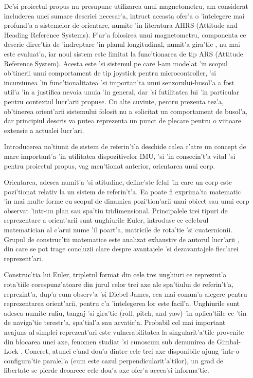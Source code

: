 \documentclass[12pt,a4paper,twoside]{report}
\begin{document}
De'si proiectul propus nu presupune utilizarea unui magnetometru, am considerat includerea unei sumare descriei necesar'a, intruc\ia t aceasta ofer'a o 'intelegere mai profund'a a sistemelor de orientare, numite 'in literatura AHRS (Attitude and Heading Reference Systems). F'ar'a folosirea unui magnetometru, componenta ce descrie direc'tia de 'indreptare 'in planul longitudinal, numit'a gira'tie \cite{article2},  nu mai este evaluat'a, iar noul sistem este limitat la func'tionarea de tip ARS (Attitude Reference System). Acesta este 'si sistemul pe care l-am modelat 'in scopul ob'tinerii unui comportament de tip joystick pentru microcontroller, 'si incursiunea 'in func'tionalitatea 'si importan'ta unui senzorului-busol'a a fost util'a 'in a justifica nevoia unuia 'in general, dar 'si futilitatea lui 'in particular pentru contextul lucr'arii propuse. Cu alte cuvinte, pentru prezenta tez'a, ob'tinerea orient'arii sistemului folosit nu a solicitat un comportament de busol'a, dar principiul descris va putea reprezenta un punct de plecare pentru o viitoare extensie a actualei lucr'ari.

\vspace{5px}

Introducerea no'tiunii de sistem de referin't'a deschide calea c'atre un concept de mare important'a 'in utilitatea dispozitivelor IMU, 'si 'in consecin't'a vital 'si pentru proiectul propus, vag men'tionat anterior, orientarea unui corp.

\vspace{5px}

Orientarea, adesea numit'a 'si atitudine, define'ste felul 'in care un corp este pozi'tionat relativ la un sistem de referin't'a. Ea poate fi exprima'ta matematic 'in mai multe forme cu scopul de dinamica pozi'tion'arii unui obiect sau unui corp observat 'intr-un plan sau spa'tiu tridimensional. Principalele trei tipuri de reprezentare a orient'arii sunt unghiurile Euler, introduse ce celebrul matematician al c'arui nume 'il poart'a, matricile de rota'tie 'si cuaternionii. Grupul de construc'tii matematice este analizat exhaustiv de autorul lucr'arii \cite{article3}, din care se pot trage concluzii clare despre avantajele 'si dezavantajele fiec'arei reprezent'ari.

\vspace{5px}

Construc'tia lui Euler, tripletul format din cele trei unghiuri ce reprezint'a rota'tiile corespunz'atoare din jurul celor trei axe ale spa'tiului de referin't'a, reprezint'a, dup'a cum observ'a 'si Diebel James, cea mai comun'a alegere pentru reprezentarea orient'arii, pentru c'a 'intelegerea lor este facil'a. Unghiurile sunt adesea numite ruliu, tangaj 'si gira'tie (roll, pitch, and yaw) 'in aplica'tiile ce 'tin de naviga'tie terestr'a, spa'tial'a sau acvatic'a. Probabil cel mai important neajuns al simplei reprezent'ari este vulnerabilitatea la singularit'a'tile provenite din blocarea unei axe, fenomen studiat 'si cunoscum sub denumirea de Gimbal-Lock \cite{article3}. Concret, atunci c'and dou'a dintre cele trei axe disponibile ajung 'intr-o configura'tie paralel'a (cum este cazul perpendicularit'a'tilor), un grad de libertate se pierde deoarece cele dou'a axe ofer'a aceea'si informa'tie. 
\end{document}
